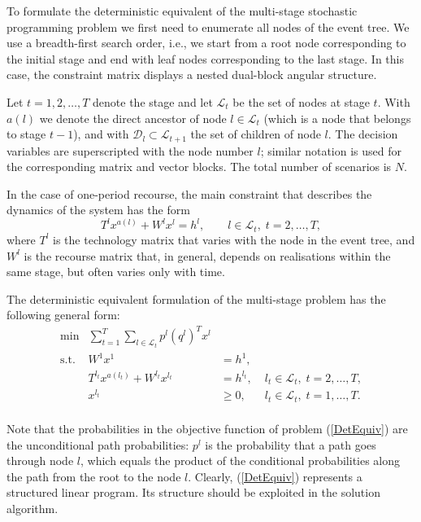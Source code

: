 
To formulate the deterministic equivalent of the multi-stage 
stochastic programming problem we first need to enumerate all nodes 
of the event tree. We use a breadth-first 
search order, i.e., we start from a root node corresponding 
to the initial stage and end with leaf nodes corresponding 
to the last stage. In this case, the constraint matrix displays
a nested dual-block angular structure.

Let $t = 1,2,\ldots,T$ denote the stage and let $\mathcal{L}_t$ 
be the set of nodes at stage $t$.
With $a(l)$ we denote the direct ancestor of node $l\in\mathcal{L}_t$ 
(which is a node that belongs to stage $t-1$), and with
$\mathcal{D}_l\subset\mathcal{L}_{t+1}$ the set of children of node $l$.
The decision variables are superscripted with the node number $l$;
similar notation is used for the corresponding matrix and vector blocks.
The total number of scenarios is $N$.

In the case of one-period recourse, 
the main constraint that describes the dynamics of the system has the form 
\[
  T^{l}x^{a(l)} +W^{l}x^{l} =h^{l}, \qquad l \in\mathcal{L}_t,\; t=2,\ldots,T,
\]
%
where $T^{l}$ is the technology matrix that varies 
with the node in the event tree, and $W^{l}$ is the recourse
matrix that, in general, depends on realisations within the same stage,
but often varies only with time.

The deterministic equivalent formulation of the multi-stage 
problem has the following general form:
\begin{equation}  \label{DetEquiv}
  \begin{array}{rrcll}
  \min & \displaystyle\sum_{t=1}^T\sum_{l\in\mathcal{L}_t} p^l (q^l)^T x^{l}\\
  \mbox{s.t.} & W^1 x^1 &\!\!\!\! = h^1, \\
    & T^{l_t} x^{a(l_t)} + W^{l_t} x^{l_t} &\!\!\!\! = h^{l_t}, 
                               &\; l_t\in\mathcal{L}_t,\; t = 2,\dots,T, \\
    & x^{l_t} &\!\!\!\!\!\!\! \geq 0,
                               &\; l_t\in\mathcal{L}_t,\; t = 1,\dots,T. \\
  \end{array}
\end{equation}

Note that the probabilities in the objective function of problem 
(\ref{DetEquiv}) are the unconditional path probabilities: $p^l$ is 
the probability that a path goes through node $l$, which equals the 
product of the conditional probabilities along the path from the root 
to the node $l$.
Clearly, (\ref{DetEquiv}) represents a structured linear program. Its 
structure should be exploited in the solution algorithm.

